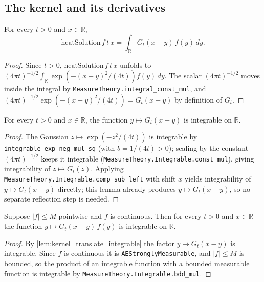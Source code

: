 \subsection{The kernel and its derivatives}

\begin{lemma}
    \label{lem:heatSolution_eq_kernel_integral}
    \leanok
    For every $t > 0$ and $x \in \mathbb{R}$,
    \[ \mathrm{heatSolution}\,f\,t\,x = \int_{\mathbb{R}} G_t(x-y)\, f(y)\, dy. \]
\end{lemma}
\begin{proof}
    Since $t > 0$, $\mathrm{heatSolution}\,f\,t\,x$ unfolds to
    $(4\pi t)^{-1/2}\int_{\mathbb{R}} \exp(-(x-y)^2/(4t)) f(y)\, dy$. The scalar
    $(4\pi t)^{-1/2}$ moves inside the integral by
    \texttt{MeasureTheory.integral\_const\_mul}, and
    $(4\pi t)^{-1/2}\exp(-(x-y)^2/(4t)) = G_t(x-y)$ by definition of $G_t$.
\end{proof}

\begin{lemma}
    \label{lem:kernel_translate_integrable}
    \leanok
    For every $t > 0$ and $x \in \mathbb{R}$, the function $y \mapsto G_t(x-y)$ is
    integrable on $\mathbb{R}$.
\end{lemma}
\begin{proof}
    The Gaussian $z \mapsto \exp(-z^2/(4t))$ is integrable by
    \texttt{integrable\_exp\_neg\_mul\_sq} (with $b = 1/(4t) > 0$); scaling by the
    constant $(4\pi t)^{-1/2}$ keeps it integrable
    (\texttt{MeasureTheory.Integrable.const\_mul}), giving integrability of
    $z \mapsto G_t(z)$. Applying \texttt{MeasureTheory.Integrable.comp\_sub\_left}
    with shift $x$ yields integrability of $y \mapsto G_t(x-y)$ directly; this lemma
    already produces $y \mapsto G_t(x - y)$, so no separate reflection step is needed.
\end{proof}

\begin{lemma}
    \label{lem:kernel_integrand_integrable}
    \leanok
    Suppose $\lvert f \rvert \le M$ pointwise and $f$ is continuous. Then for every
    $t > 0$ and $x \in \mathbb{R}$ the function $y \mapsto G_t(x-y)\, f(y)$ is
    integrable on $\mathbb{R}$.
\end{lemma}
\begin{proof}
    By \cref{lem:kernel_translate_integrable} the factor $y \mapsto G_t(x-y)$ is
    integrable. Since $f$ is continuous it is \texttt{AEStronglyMeasurable}, and
    $\lvert f \rvert \le M$ is bounded, so the product of an integrable function with a
    bounded measurable function is integrable by
    \texttt{MeasureTheory.Integrable.bdd\_mul}.
\end{proof}

